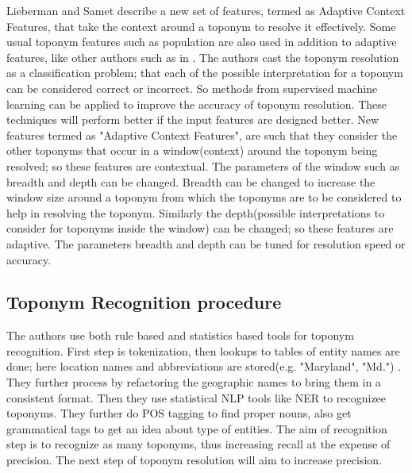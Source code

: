 \documentclass[
     11pt,         %
     a4paper,      %
     oneside,
     ]{article}
\begin{document}
Lieberman and Samet \cite{Lieberman12adaptivecontext} describe a new set of features, termed as Adaptive Context Features, that take the context around a toponym to resolve it effectively. Some usual toponym features such as population are also used in addition to adaptive features, like other authors such as in \cite{Amitay:2004:WGW:1008992.1009040}. The authors cast the toponym resolution as a classification problem; that each of the possible interpretation for a toponym can be considered correct or incorrect. So methods from supervised machine learning can be applied to improve the accuracy of toponym resolution. These techniques will perform better if the input features are designed better. New features termed as "Adaptive Context Features", are such that they consider the other toponyms that occur in a window(context) around the toponym being resolved; so these features are contextual. The parameters of the window such as breadth and depth can be changed. Breadth can be changed to increase the window size around a toponym from which the toponyms are to be considered to help in resolving the toponym. Similarly the depth(possible interpretations to consider for toponyms inside the window) can be changed; so these features are adaptive. The parameters breadth and depth can be tuned for resolution speed or accuracy.

\subsection{Toponym Recognition procedure}\label{subsec:titlepage}
The authors use both rule based and statistics based tools for toponym recognition. First step is tokenization, then lookups to tables of entity names are done; here location names and abbreviations are stored(e.g. "Maryland", "Md.") \cite{Lieberman12adaptivecontext}. They further process by refactoring the geographic names to bring them in a consistent format. Then they use statistical NLP tools like NER to recognizee toponyms. They further do POS tagging to find proper nouns, also get grammatical tags to get an idea about type of entities. The aim of recognition step is to recognize as many toponyms, thus increasing recall at the expense of precision. The next step of toponym resolution will aim to increase precision.
\end{document}
